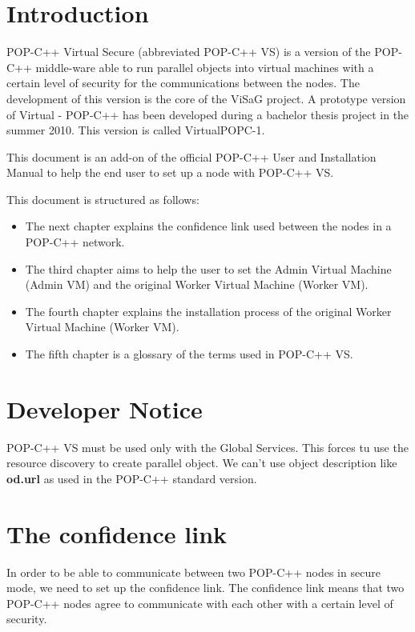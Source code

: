\documentclass[a4paper, 11pt]{article}
\newcommand{\s}{\vspace{0.3cm}}
\begin{document}




\tableofcontents
\pagebreak
\section{Introduction}
POP-C++ Virtual Secure (abbreviated POP-C++ VS) is a version of the POP-C++ middle-ware able to run parallel objects into virtual machines with a certain level of security for the communications between the nodes. The development of this version is the core of the ViSaG project. A prototype version of Virtual - POP-C++ has been developed during a bachelor thesis project in the summer 2010. This version is called VirtualPOPC-1\cite{vpopc1}.\s

This document is an add-on of the official POP-C++ User and Installation Manual\cite{popc_manual} to help the end user to set up a node with POP-C++ VS. \s

This document is structured as follows: 

\begin{itemize}
\item The next chapter explains the confidence link used between the nodes in a POP-C++ network. 
\item The third chapter aims to help the user to set the Admin Virtual Machine (Admin VM) and the original Worker Virtual Machine (Worker VM).
\item The fourth chapter explains the installation process of the original Worker Virtual Machine (Worker VM).
\item The fifth chapter is a glossary of the terms used in POP-C++ VS.
\end{itemize}

\section{Developer Notice}
POP-C++ VS must be used only with the Global Services. This forces tu use the resource discovery to create parallel object. We can't use object description like \textbf{od.url} as used in the POP-C++ standard version.

\section{The confidence link}

In order to be able to communicate between two POP-C++ nodes in secure mode, we need to set up the confidence link. The confidence link means that two POP-C++ nodes agree to communicate with each other with a certain level of security. \s
\end{document}
